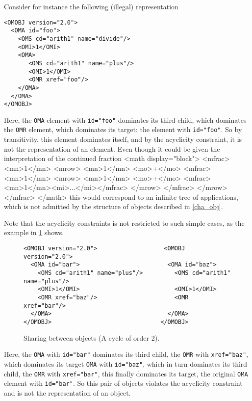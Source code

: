 Consider for instance the following (illegal) \XML representation
\begin{lstlisting}
<OMOBJ version="2.0">
  <OMA id="foo">
    <OMS cd="arith1" name="divide"/>
    <OMI>1</OMI>
    <OMA>
       <OMS cd="arith1" name="plus"/>
       <OMI>1</OMI>
       <OMR xref="foo"/>
    </OMA> 
  </OMA>
</OMOBJ>
\end{lstlisting}

Here, the \lstinline|OMA| element with
\lstinline|id="foo"| dominates its third child, which dominates the
\lstinline|OMR| element, which dominates its target: the element with
\lstinline|id="foo"|. So by transitivity, this element dominates itself, and
by the acyclicity constraint, it is not the \XML representation of an \OM
element. Even though it could be given the interpretation of the continued fraction
<math display="block">
 <mfrac>
   <mn>1</mn>
   <mrow>
     <mn>1</mn>
     <mo>+</mo>
     <mfrac>
       <mn>1</mn>
       <mrow>
         <mn>1</mn>
         <mo>+</mo>
         <mfrac><mn>1</mn><mi>...</mi></mfrac>
       </mrow>
     </mfrac>
   </mrow>
 </mfrac>
</math> this would correspond to an infinite tree of applications,
which is not admitted by the structure of \OM objects described
in \ref{cha_obj}.


Note that the acyclicity constraints is not restricted
to such simple cases, as the example in \ref{fig_sharing_between}
shows.


\begin{figure}\centering
\caption{Sharing between \OM objects (A cycle of order 2).}\label{fig_sharing_between}
\begin{lstlisting}
<OMOBJ version="2.0">                   <OMOBJ version="2.0">
  <OMA id="bar">                         <OMA id="baz">
    <OMS cd="arith1" name="plus"/>         <OMS cd="arith1" name="plus"/>
    <OMI>1</OMI>                           <OMI>1</OMI>
    <OMR xref="baz"/>                      <OMR xref="bar"/>
  </OMA>                                 </OMA>
</OMOBJ>                               </OMOBJ>
\end{lstlisting}
\end{figure}

 Here, the \lstinline|OMA| with
\lstinline|id="bar"| dominates its third child, the
\lstinline|OMR| with \lstinline|xref="baz"|,
which dominates its target \lstinline|OMA| with
\lstinline|id="baz"|, which in turn dominates its third
child, the \lstinline|OMR| with
\lstinline|xref="bar"|, this finally dominates its
target, the original \lstinline|OMA| element with
\lstinline|id="bar"|. So this pair of \OM objects
violates the acyclicity constraint and is not the \XML
representation of an \OM object.




